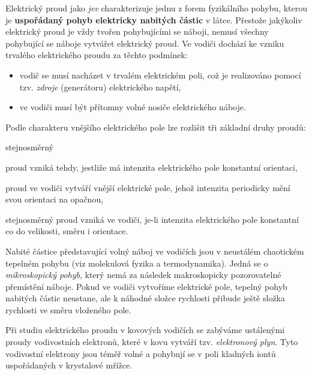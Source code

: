 {        Elektrický proud jako \emph{jev} charakterizuje jednu z forem fyzikálního pohybu, kterou je
        \textbf{uspořádaný pohyb elektricky nabitých částic} v látce. Přestože jakýkoliv elektrický
        proud je vždy tvořen pohybujícími se náboji, nemusí všechny pohybující se náboje vytvářet
        elektrický proud. Ve vodiči dochází ke vzniku trvalého elektrického proudu za těchto
        podmínek:
          \begin{itemize}\addtolength{\itemsep}{-0.5\baselineskip}
            \item vodič se musí nacházet v trvalém elektrickém poli, což je realizováno pomocí tzv.
                  \emph{zdroje} (generátoru) elektrického napětí,
            \item ve vodiči musí být přítomny volné nosiče elektrického náboje.
          \end{itemize}
        
        Podle charakteru vnějšího elektrického pole lze rozlišit tři základní druhy proudů:
          \begin{labeling}{stejnosměrný}\addtolength{\itemsep}{-0.5\baselineskip}
            \item[\textbf{stejnosměrný}] proud vzniká tehdy, jestliže má intenzita elektrického pole
                   konstantní orientaci,
            \item[\textbf{střídavý}] proud ve vodiči vytváří vnější elektrické pole, jehož intenzita
                  periodicky mění svou orientaci na opačnou,
            \item[\textbf{stacionární}] stejnosměrný proud vzniká ve vodiči, je-li intenzita
                  elektrického pole konstantní co do velikosti, směru i orientace.
          \end{labeling}  

       Nabité částice představující volný náboj ve vodičích jsou v neustálém chaotickém tepelném
       pohybu (viz molekulová fyzika a termodynamika). Jedná se o \emph{mikroskopický pohyb}, který
       nemá za následek makroskopicky pozorovatelné přemístění náboje. Pokud ve vodiči vytvoříme
       elektrické pole, tepelný pohyb nabitých částic neustane, ale k náhodné složce rychlosti
       přibude ještě složka rychlosti ve směru vloženého pole.
       
       Při studiu elektrického proudu v kovových vodičích se zabýváme ustálenými proudy
       vodivostních elektronů, které v kovu vytváří tzv. \emph{elektronový plyn}. Tyto vodivostní
       elektrony jsou téměř volné a pohybují se v poli kladných iontů uspořádaných v krystalové
       mřížce.
        
}
